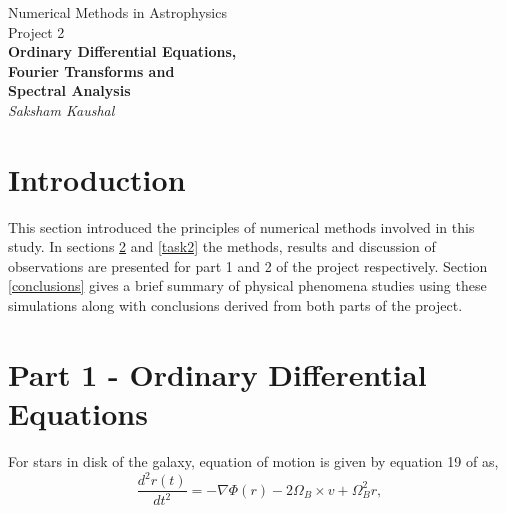 \documentclass[a4paper]{article}
\begin{document}
	
	
	\begin{titlepage}
		\begin{center}
			\Large Numerical Methods in Astrophysics \\
			\vspace{1cm}
			\huge{
				Project 2 \\
				\vspace{0.5cm}
				\textbf{Ordinary Differential Equations,}\\
				\textbf{Fourier Transforms and} \\
				\textbf{Spectral Analysis} \\
				\vspace{1cm}
			}
			\Large \emph{Saksham Kaushal}
		\end{center}
	\end{titlepage}
	
	
	\tableofcontents
	\newpage
	
	
	\section{Introduction} \label{Introduction}
	
	This section introduced the principles of numerical methods involved in this study. In sections \ref{task1} and \ref{task2} the methods, results and discussion of observations are presented for part 1 and 2 of the project respectively. Section \ref{conclusions} gives a brief summary of physical phenomena studies using these simulations along with conclusions derived from both parts of the project.
	
	
	\newpage
	\section{Part 1 - Ordinary Differential Equations} \label{task1}
	
	For stars in disk of the galaxy, equation of motion is given by equation 19 of \cite{lecture_3} as,
	\begin{equation}
		\frac{d^2r(t)}{dt^2} = - \nabla \Phi (r) -2 \Omega_B \times v+ \Omega_B^2 r ,
		\label{eq:motion1}
	\end{equation}
	
\end{document}
